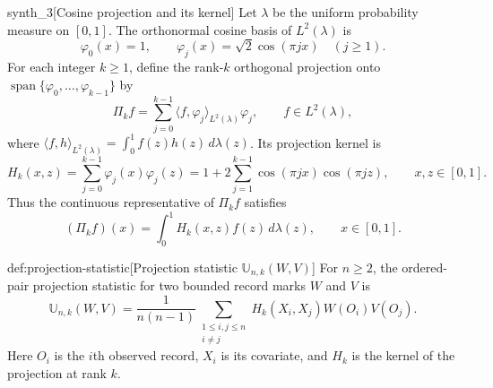 \documentclass[11pt]{article}
\begin{document}
\begin{definitionv}{synth_3}[Cosine projection and its kernel]
Let \(\lambda\) be the uniform probability measure on \([0,1]\). The orthonormal cosine basis of \(L^2(\lambda)\) is
\[
\varphi_0(x)=1,\qquad
\varphi_j(x)=\sqrt{2}\cos(\pi jx)\quad(j\ge1).
\]
For each integer \(k\ge1\), define the rank-\(k\) orthogonal projection onto \(\operatorname{span}\{\varphi_0,\ldots,\varphi_{k-1}\}\) by
\[
\Pi_k f
=\sum_{j=0}^{k-1}\langle f,\varphi_j\rangle_{L^2(\lambda)}\varphi_j,
\qquad f\in L^2(\lambda),
\]
where \(\langle f,h\rangle_{L^2(\lambda)}=\int_0^1 f(z)h(z)\,d\lambda(z)\). Its projection kernel is
\[
H_k(x,z)=\sum_{j=0}^{k-1}\varphi_j(x)\varphi_j(z)
=1+2\sum_{j=1}^{k-1}\cos(\pi jx)\cos(\pi jz),
\qquad x,z\in[0,1].
\]
Thus the continuous representative of \(\Pi_k f\) satisfies
\[
(\Pi_k f)(x)=\int_0^1 H_k(x,z)f(z)\,d\lambda(z),
\qquad x\in[0,1].
\]
\end{definitionv}

\begin{definitionv}{def:projection-statistic}[Projection statistic $\mathbb U_{n,k}(W,V)$]
For \(n\ge2\), the ordered-pair projection statistic for two bounded record marks \(W\) and \(V\) is
\[
\mathbb U_{n,k}(W,V)
=
\frac{1}{n(n-1)}
\sum_{\substack{1\le i,j\le n\\ i\ne j}}
H_k(X_i,X_j)W(O_i)V(O_j).
\]
Here \(O_i\) is the \(i\)th observed record, \(X_i\) is its covariate, and \(H_k\) is the kernel of the projection at rank \(k\).
\end{definitionv}
\end{document}

